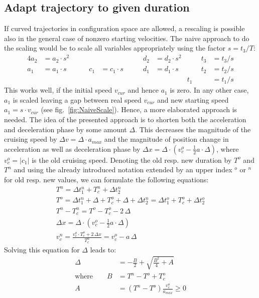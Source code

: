 \documentclass[11pt,english]{article}
\newcommand{\vc}{v_{cur}}
\newcommand{\am}{a_{max}}
\newcommand{\half}{\frac{1}{2}}
\newcommand{\abs}[1]{|#1|}
\begin{document}
\subsection{Adapt trajectory to given duration}
If curved trajectories in configuration space are allowed, a rescaling is
possible also in the general case of nonzero starting velocities.
The naive approach to do the scaling would be to scale all variables
appropriately using the factor $s = t_3 / T$:
\begin{alignat*}{4}
  a_2 &= a_2 \cdot s^2 &\qquad &&\qquad d_2 &= d_2 \cdot s^2 &\qquad 
  t_3 &= t_3 / s \\
  a_1 &= a_1 \cdot s &\qquad c_1 &= c_1 \cdot s &\qquad d_1 &= d_1 \cdot s 
  &\qquad t_2 &= t_2 / s \\
  && && && t_1 &= t_1 / s
\end{alignat*}
This works well, if the initial speed $\vc$ and hence $a_1$ is zero. In any
other case, $a_1$ is scaled leaving a gap between real speed $\vc$ and new
starting speed $a_1 = s \cdot \vc$ (see fig.~\ref{fig:NaiveScale}). Hence, a
more elaborated approach is needed. The idea of the presented approach is to
shorten both the acceleration and deceleration phase by some amount $\Delta$.
This decreases the magnitude of the cruising speed by $\Delta v = \Delta \cdot
\am$ and the magnitude of position change in acceleration as well as
deceleration phase by $\Delta x = \Delta \cdot (v_c^o - \half a \cdot
\Delta)$, where $v_c^o=\abs{c_1}$ is the old cruising speed. Denoting the old
resp. new duration by $T^o$ and $T^n$ and using the already introduced
notation extended by an upper index $^o$ or $^n$ for old resp. new values, we
can formulate the following equations:
\begin{gather*}
  T^n = \Delta t_1^n + T_c^n + \Delta t_2^n \tag{1}\\
  T^o = \Delta t_1^n + \Delta + T_c^o + \Delta + \Delta t_2^n =
  \Delta t_1^o + T_c^o + \Delta t_2^o \tag{2}\\
  T^n - T_c^n = T^o - T_c^o - 2 \, \Delta \tag{1+2}\\
  \Delta x = \Delta \cdot (v_c^o - \half a \cdot \Delta) \\
  v_c^n = \frac{v_c^o \cdot T_c^o + 2 \, \Delta x}{T_c^n} = v_c^o - a \, \Delta
\end{gather*}
Solving this equation for $\Delta$ leads to:
\begin{align*}
  \Delta &= -\frac{B}{2} + \sqrt{\frac{B^2}{4} + A} \\
  \text{where}\qquad B &= T^n - T^o + T_c^o \\
  A &= (T^n - T^o) \frac{v_c^o}{\am} \geq 0
\end{align*}
\end{document}
